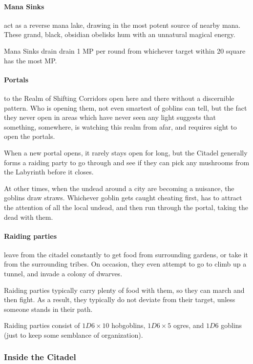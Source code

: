\begin{multicols}{2}
\paragraph{Mana Sinks}
act as a reverse mana lake, drawing in the most potent source of nearby mana.
These grand, black, obsidian obelisks hum with an unnatural magical energy.

Mana Sinks drain drain 1 MP per round from whichever target within 20 square has the most MP.

\paragraph{Portals}
to the Realm of Shifting Corridors open here and there without a discernible pattern.
Who is opening them, not even smartest of goblins can tell, but the fact they never open in areas which have never seen any light suggests that something, somewhere, is watching this realm from afar, and requires sight to open the portals.

When a new portal opens, it rarely stays open for long, but the Citadel generally forms a raiding party to go through and see if they can pick any mushrooms from the Labyrinth before it closes.

At other times, when the undead around a city are becoming a nuisance, the goblins draw straws.
Whichever goblin gets caught cheating first, has to attract the attention of all the local undead, and then run through the portal, taking the dead with them.

\paragraph{Raiding parties}
leave from the citadel constantly to get food from surrounding gardens, or take it from the surrounding tribes.
On occasion, they even attempt to go to climb up a tunnel, and invade a colony of dwarves.

Raiding parties typically carry plenty of food with them, so they can march and then fight.
As a result, they typically do not deviate from their target, unless someone stands in their path.

Raiding parties consist of $1D6 \times 10$ hobgoblins, $1D6 \times 5$ ogres, and $1D6$ goblins (just to keep some semblance of organization).


\subsubsection{Inside the Citadel}


\end{multicols}
